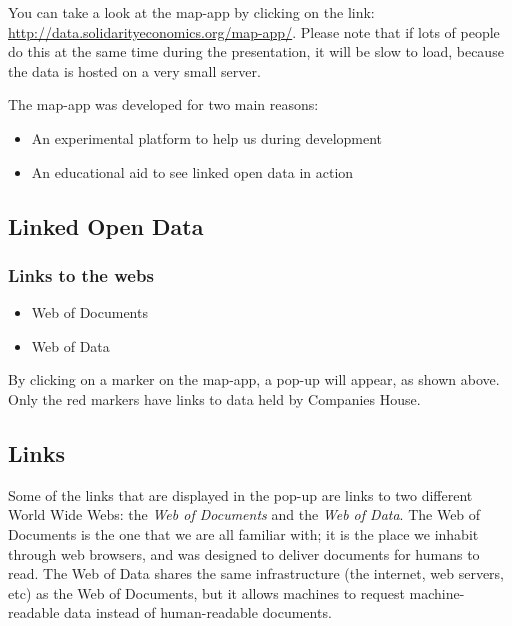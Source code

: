 You can take a look at the map-app by clicking on the link: \url{http://data.solidarityeconomics.org/map-app/}.
Please note that if lots of people do this at the same time during the presentation, it will be slow to load, because the data is hosted on a very small server.

The map-app was developed for two main reasons:
  \begin{itemize}
    \item An experimental platform to help us during development
    \item An educational aid to see linked open data in action 
  \end{itemize}

\subsection{Linked Open Data}
\frame
{
  \frametitle{Links to the webs}
  \begin{center}
  \end{center}
  \begin{itemize}
    \item Web of Documents
    \item Web of Data
  \end{itemize}
}
By clicking on a marker on the map-app, a pop-up will appear, as shown above.
Only the red markers have links to data held by Companies House.

\subsection<article>{Links}

Some of the links that are displayed in the pop-up are links to two different World Wide Webs: the \textit{Web of Documents} and the \textit{Web of Data}.
The Web of Documents is the one that we are all familiar with; it is the place we inhabit through web browsers, and was designed to deliver documents for humans to read.
The Web of Data shares the same infrastructure (the internet, web servers, etc) as the Web of Documents, but it allows machines to request machine-readable data instead of human-readable documents.

